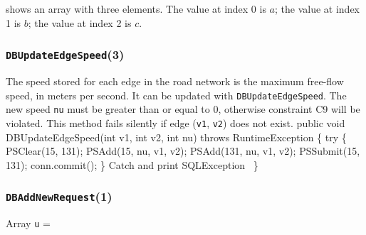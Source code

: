 \documentclass{article}
\def\nwendcode{\endtrivlist \endgroup}
\let\nwdocspar=\par
\theoremstyle{definition}
\begin{document}
\noindent shows an array with three elements. The value at index 0 is $a$; the
value at index 1 is $b$; the value at index 2 is $c$.

\subsubsection{{\tt{}\protect{}DBUpdateEdgeSpeed}(3)}
The speed stored for each edge in the road network is the maximum free-flow
speed, in meters per second.  It can be updated with
{\tt{}\protect{}DBUpdateEdgeSpeed}. The new speed {\tt{}nu} must be greater than or equal to 0,
otherwise constraint C9 will be violated. This method fails silently if
edge ({\tt{}v1}, {\tt{}v2}) does not exist.
\nwenddocs{}\endmoddef{}
public void DBUpdateEdgeSpeed(int v1, int v2, int nu) throws RuntimeException \{
  try \{
    PSClear(15, 131);
    PSAdd(15, nu, v1, v2);
    PSAdd(131, nu, v1, v2);
    PSSubmit(15, 131);
    conn.commit();
  \}
  \LA{}Catch and print \code{}SQLException\edoc{}~{\nwtagstyle{}}\RA{}
\}
\eatline
{}\nwendcode{}\nwdocspar
\subsubsection{{\tt{}\protect{}DBAddNewRequest}(1)}
Array {\tt{}u} =

\noindent
{}
\end{document}
